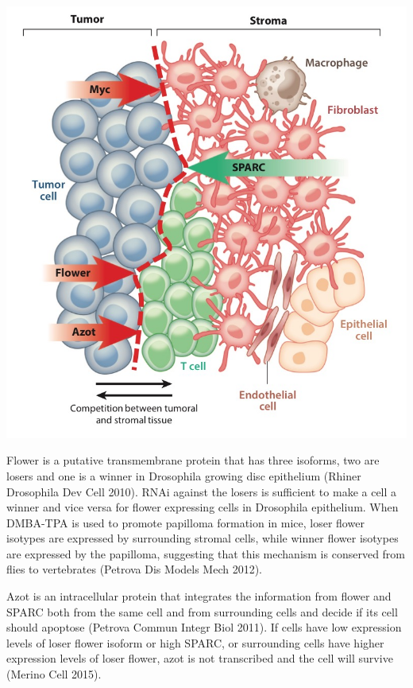 \documentclass[]{book}
\newenvironment{Shaded}{\begin{snugshade}}{\end{snugshade}}
\newcommand{\KeywordTok}[1]{\textcolor[rgb]{0.13,0.29,0.53}{\textbf{#1}}}
\newcommand{\DataTypeTok}[1]{\textcolor[rgb]{0.13,0.29,0.53}{#1}}
\newcommand{\DecValTok}[1]{\textcolor[rgb]{0.00,0.00,0.81}{#1}}
\newcommand{\OtherTok}[1]{\textcolor[rgb]{0.56,0.35,0.01}{#1}}
\newcommand{\OperatorTok}[1]{\textcolor[rgb]{0.81,0.36,0.00}{\textbf{#1}}}
\newcommand{\NormalTok}[1]{#1}
\begin{document}
\includegraphics{images/04-1.jpg}

\begin{Shaded}
\end{Shaded}

Flower is a putative transmembrane protein that has three isoforms, two
are losers and one is a winner in Drosophila growing disc epithelium
(Rhiner Drosophila Dev Cell 2010). RNAi against the losers is sufficient
to make a cell a winner and vice versa for flower expressing cells in
Drosophila epithelium. When DMBA-TPA is used to promote papilloma
formation in mice, loser flower isotypes are expressed by surrounding
stromal cells, while winner flower isotypes are expressed by the
papilloma, suggesting that this mechanism is conserved from flies to
vertebrates (Petrova Dis Models Mech 2012).

Azot is an intracellular protein that integrates the information from
flower and SPARC both from the same cell and from surrounding cells and
decide if its cell should apoptose (Petrova Commun Integr Biol 2011). If
cells have low expression levels of loser flower isoform or high SPARC,
or surrounding cells have higher expression levels of loser flower, azot
is not transcribed and the cell will survive (Merino Cell 2015).
\end{document}
